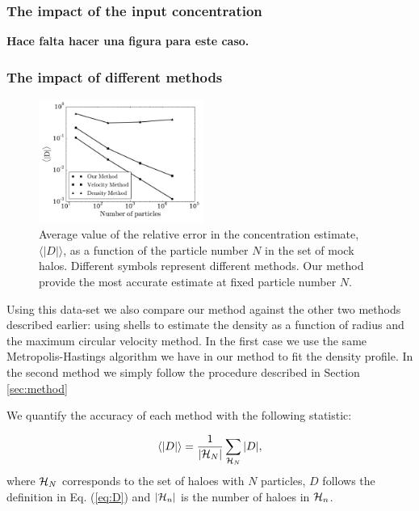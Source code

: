 \documentclass[useAMS,usenatbib]{mn2e}
\newcommand{\avg}[1]{\langle{#1}\rangle}
\begin{document}
\subsubsection{The impact of the input concentration}

{\bf Hace falta hacer una figura para este caso.}

\subsubsection{The impact of different methods}

\begin{figure}
\begin{center}
  \includegraphics[width=0.48\textwidth]{error.pdf}
\end{center}
\caption{Average value of the relative error in the concentration
  estimate, $\avg{|D|}$, as a function of the particle number $N$ in
  the set of mock halos. Different symbols represent different
  methods. Our method provide the most accurate estimate at fixed
  particle number $N$.
    \label{fig:error}}
\end{figure}


Using this data-set we also compare our method against the other two
methods described earlier: using shells to estimate the density as a
function of radius and the maximum circular velocity method.
In the first case we use the same Metropolis-Hastings algorithm we
have in our method to fit the density profile.
In the second method we simply follow the procedure described in
Section \ref{sec:method}

We quantify the accuracy of each method with the following statistic:

\begin{equation}
\avg{|D|}=\frac{1}{\left|{\cal{H}}_N\right|}\sum_{{\cal{H}}_N} |D|,
\end{equation}
%
where ${\cal{H}}_N$ corresponds to the set of haloes with $N$
particles, $D$ follows the definition in Eq. (\ref{eq:D}) and
$\left|{\cal{H}}_n\right|$ is the number of haloes in ${\cal{H}}_n$.
\end{document}
